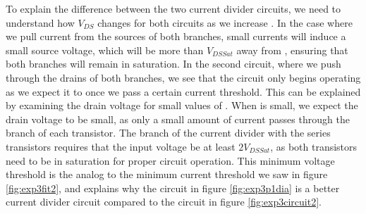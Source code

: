 To explain the difference between the two current divider circuits, we need to understand how $V_{DS}$ changes for both circuits as we increase \Iin. In the case where we pull current from the sources of both branches, small currents will induce a small source voltage, which will be more than $V_{DSSat}$ away from \Vdd, ensuring that both branches will remain in saturation. In the second circuit, where we push \Iin through the drains of both branches, we see that the circuit only begins operating as we expect it to once we pass a certain current threshold. This can be explained by examining the drain voltage for small values of \Iin. When \Iin is small, we expect the drain voltage to be small, as only a small amount of current passes through the branch of each transistor. The branch of the current divider with the series transistors requires that the input voltage be at least $2V_{DSSat}$, as both transistors need to be in saturation for proper circuit operation. This minimum voltage threshold is the analog to the minimum current threshold we saw in figure \ref{fig:exp3fit2}, and explains why the circuit in figure \ref{fig:exp3p1dia} is a better current divider circuit compared to the circuit in figure \ref{fig:exp3circuit2}.
